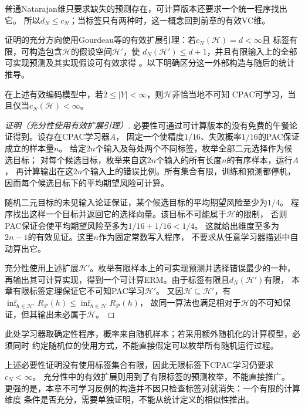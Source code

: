 普通Natarajan维只要求缺失的预测存在，可计算版本还要求一个统一程序找出它。
所以$d_N\leq c_N$；当标签只有两种时，这一概念回到前章的有效VC维。

证明的充分方向使用Gourdeau等的有效扩展引理：若$c_N(\mathcal H)=d<\infty$且
标签有限，可构造包含$\mathcal H$的假设空间$\mathcal H'$，使
$d_N(\mathcal H')\leq d+1$，并且有限输入上的全部可实现预测及其实现假设可有效求得
。以下明确区分这一外部构造与随后的统计推导。

\begin{theorem}[有限标签的非恰当CPAC刻画]
\label{thm:computable-multiclass-characterization}
在上述有效编码模型中，若$2\leq|Y|<\infty$，则$\mathcal H$非恰当地不可知
CPAC可学习，当且仅当$c_N(\mathcal H)<\infty$。
\end{theorem}
\begin{proof}[证明（充分性使用有效扩展引理）]
必要性可通过可计算版本的没有免费的午餐论证得到。设存在CPAC学习器$A$，
固定一个使精度$1/16$、失败概率$1/16$的PAC保证成立的样本量$n$。
给定$2n$个输入及每处两个不同标签，枚举全部二元选择作为候选目标；
对每个候选目标，枚举来自这$2n$个输入的所有长度$n$的有序样本，运行$A$，
再计算输出在这$2n$个输入上的错误比例。所有集合有限，训练和预测都停机，
因而每个候选目标下的平均期望风险可计算。

随机二元目标的未见输入论证保证，某个候选目标的平均期望风险至少为$1/4$。
程序找出这样一个目标并返回它的选择向量。该目标不可能属于$\mathcal H$的限制，
否则PAC保证会使平均期望风险至多为$1/16+1/16<1/4$。
这就给出维度至多为$2n-1$的有效见证。这里$n$作为固定常数写入程序，
不要求从任意学习器描述中自动算出它。

充分性使用上述扩展$\mathcal H'$。枚举有限样本上的可实现预测并选择错误最少的一种，
再输出其可计算实现，得到一个可计算ERM。由于标签有限且$d_N(\mathcal H')$有限，
本章有限标签定理保证它不可知PAC学习$\mathcal H'$。
又因$\mathcal H\subseteq\mathcal H'$，有
$\inf_{h\in\mathcal H'}R_{\mathcal P}(h)\leq\inf_{h\in\mathcal H}R_{\mathcal P}(h)$，
故同一算法也满足相对于$\mathcal H$的不可知保证，但其输出未必属于$\mathcal H$。
\end{proof}

此处学习器取确定性程序，概率来自随机样本；若采用额外随机化的计算模型，必须同时
约定随机位的使用方式，不能直接假定可以枚举所有随机运行过程。

上述必要性证明没有使用标签集合有限，因此无限标签下CPAC学习仍要求$c_N<\infty$。
充分性中的有效扩展则用到了有限标签的预测枚举，不能直接推广。
更强的是，本章不可学习反例的构造并不因只检查标签对就消失：一个有限的计算维度
条件是否充分，需要单独证明，不能从统计定义的相似性推出。

